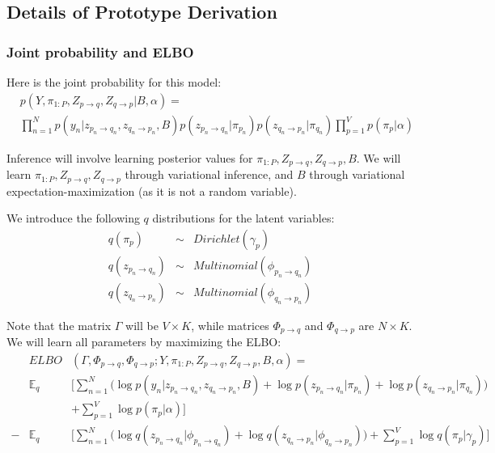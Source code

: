 \subsection{Details of Prototype Derivation}
\label{sec:mmsb_appendix}

\subsubsection{Joint probability and ELBO}

Here is the joint probability for this model:
\begin{eqnarray*}
&p(Y, \pi_{1:P}, Z_{p \rightarrow q}, Z_{q \rightarrow p} | B, \alpha) = \\
&\prod_{n=1}^N p(y_n | z_{p_n \rightarrow q_n}, z_{q_n \rightarrow p_n} , B)
p(z_{p_n \rightarrow q_n} | \pi_{p_n}) p(z_{q_n \rightarrow p_n} | \pi_{q_n})
\prod_{p = 1}^V p(\pi_p| \alpha)
\end{eqnarray*}

Inference will involve learning posterior values for $\pi_{1:P}, Z_{p \rightarrow q}, Z_{q \rightarrow p}, B$.
We will learn $\pi_{1:P}, Z_{p \rightarrow q}, Z_{q \rightarrow p}$ through variational inference, and $B$ through variational expectation-maximization (as it is not a random variable).

We introduce the following $	q$ distributions for the latent variables:
\begin{eqnarray*}
q(\pi_p) &\sim& Dirichlet(\gamma_p) \\ 
q(z_{p_n \rightarrow q_n}) &\sim& Multinomial(\phi_{p_n \rightarrow q_n}) \\
q(z_{q_n \rightarrow p_n}) &\sim& Multinomial(\phi_{q_n \rightarrow p_n}) 
\end{eqnarray*}

Note that the matrix $\Gamma$ will be $V \times K$, while matrices $\Phi_{p \rightarrow q}$ and $\Phi_{q \rightarrow p}$ are $N \times K$.
We will learn all parameters by maximizing the ELBO:
\begin{eqnarray*}
&ELBO&(\Gamma,\Phi_{p \rightarrow q},\Phi_{q \rightarrow p};Y, \pi_{1:P}, Z_{p \rightarrow q}, Z_{q \rightarrow p},B,\alpha) = \\
&\mathbb{E}_q&\bigg[\sum_{n=1}^N \bigg(\log p(y_n | z_{p_n \rightarrow q_n}, z_{q_n \rightarrow p_n} , B)
+ \log p(z_{p_n \rightarrow q_n} | \pi_{p_n})
+ \log p(z_{q_n \rightarrow p_n} | \pi_{q_n})\bigg) \\
&&+ \sum_{p = 1}^V \log p(\pi_p| \alpha)\bigg] \\
- &\mathbb{E}_q&\bigg[\sum_{n=1}^N \bigg( \log q(z_{p_n \rightarrow q_n} | \phi_{p_n \rightarrow q_n})
+ \log q(z_{q_n \rightarrow p_n} | \phi_{q_n \rightarrow p_n})\bigg) 
+ \sum_{p = 1}^V \log q(\pi_p| \gamma_p)\bigg]
\end{eqnarray*}

